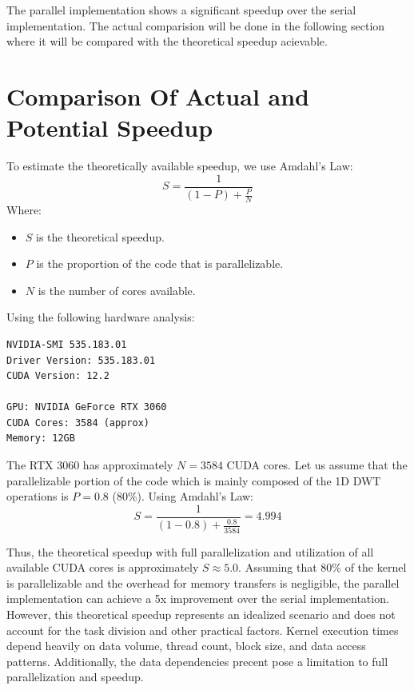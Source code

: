 \documentclass[journal,11pt]{IEEEtran}
\begin{document}
The parallel implementation shows a significant speedup over the serial implementation. The actual comparision will be done in the following section where it will be compared with the theoretical speedup acievable.

\section{Comparison Of Actual and Potential Speedup}

To estimate the theoretically available speedup, we use Amdahl's Law:
\begin{equation}
    S = \frac{1}{(1 - P) + \frac{P}{N}}
\end{equation}
Where:
\begin{itemize}
    \item $S$ is the theoretical speedup.
    \item $P$ is the proportion of the code that is parallelizable.
    \item $N$ is the number of cores available.
\end{itemize}
\noindent
Using the following hardware analysis:
\begin{verbatim}
NVIDIA-SMI 535.183.01
Driver Version: 535.183.01
CUDA Version: 12.2

GPU: NVIDIA GeForce RTX 3060
CUDA Cores: 3584 (approx)
Memory: 12GB
\end{verbatim}
\noindent
The RTX 3060 has approximately $N = 3584$ CUDA cores. Let us assume that the parallelizable portion of the code which is mainly composed of the 1D DWT operations is $P = 0.8$ (80\%).
Using Amdahl's Law:
\begin{equation}
    S = \frac{1}{(1 - 0.8) + \frac{0.8}{3584}} = 4.994
\end{equation}

Thus, the theoretical speedup with full parallelization and utilization of all available CUDA cores is approximately $S \approx 5.0$. Assuming that 80\% of the kernel is parallelizable and the overhead for memory transfers is negligible, the parallel implementation can achieve a 5x improvement over the serial implementation.\\

However, this theoretical speedup represents an idealized scenario and does not account for the task division and other practical factors. Kernel execution times depend heavily on data volume, thread count, block size, and data access patterns. Additionally, the data dependencies precent pose a limitation to full parallelization and speedup.\\
\end{document}
